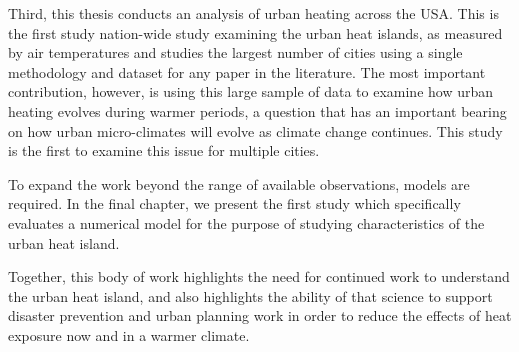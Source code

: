 Third, this thesis conducts an analysis of urban heating across the USA. This is the first study nation-wide study examining the urban heat islands, as measured by air temperatures and studies the largest number of cities using a single methodology and dataset for any paper in the literature. The most important contribution, however, is using this large sample of data to examine how urban heating evolves during warmer periods, a question that has an important bearing on how urban micro-climates will evolve as climate change continues. This study is the first to examine this issue for multiple cities. 

To expand the work beyond the range of available observations, models are required. In the final chapter, we present the first study which specifically evaluates a numerical model for the purpose of studying characteristics of the urban heat island. %

Together, this body of work highlights the need for continued work to understand the urban heat island, and also highlights the ability of that science to support disaster prevention and urban planning work in order to reduce the effects of heat exposure now and in a warmer climate. 

%
